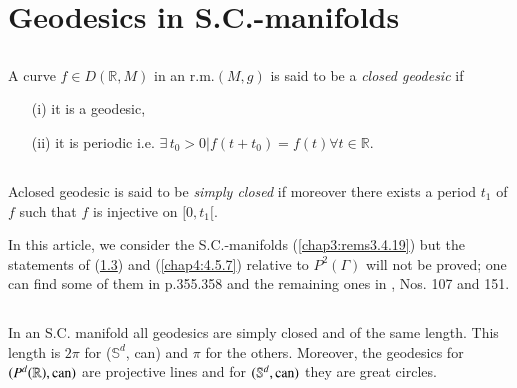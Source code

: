 \section{Geodesics in S.C.-manifolds}\label{chap4:sec5}

\subsection{}\label{chap4:4.5.1}

\begin{defi*}
A curve $f\in D(\mathbb{R},M)$ in an r.m.\@ $(M,g)$ is said to be a
{\em closed geodesic} if
\begin{itemize}
\item[(i)] it is a geodesic,

\item[(ii)] it is periodic i.e. $\exists\,
  t_{0}>0|f(t+t_{0})=f(t)\forall t\in\mathbb{R}$.
\end{itemize}
\end{defi*}

\subsection{}\label{chap4:4.5.2}

\begin{defi*}
A\pageoriginale closed geodesic is said to be {\em simply closed} if
moreover there exists a period $t_{1}$ of $f$ such that $f$ is
injective on $[0,t_{1}[$.
\end{defi*}

In this article, we consider the S.C.-manifolds (\ref{chap3:rems3.4.19}) but
the statements of (\ref{chap4:4.5.4}) and (\ref{chap4:4.5.7}) relative to
$P^{2}(\Gamma)$ will not be proved; one can find some of them in
\cite{14} p.355.358 and the remaining ones in \cite{38}, Nos. 107 and
151.

\setcounter{subsection}{3}

\subsection{}\label{chap4:4.5.4}

\begin{prop*}
In an S.C. manifold all geodesics are simply closed and of the same
length. This length is $2\pi$ for ($\mathbb{S}^{d}$, can) and $\pi$
for the others. Moreover, the geodesics for $(P^{d}(\mathbb{R}),\operatorname{can})$
are projective lines and for $(\mathbb{S}^{d},\operatorname{can})$ they are great
circles. 
\end{prop*}

